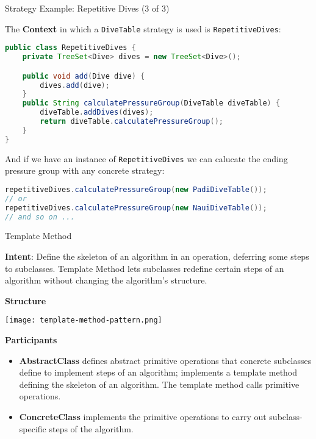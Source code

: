 \documentclass{beamer}
\begin{document}
\begin{frame}[fragile]{Strategy Example: Repetitive Dives (3 of 3)}

\vspace{-.05in}
The {\bf Context} in which a {\tt DiveTable} strategy is used is {\tt RepetitiveDives}:
\vspace{-.05in}
\begin{lstlisting}[language=Java]
public class RepetitiveDives {
    private TreeSet<Dive> dives = new TreeSet<Dive>();

    public void add(Dive dive) {
        dives.add(dive);
    }
    public String calculatePressureGroup(DiveTable diveTable) {
        diveTable.addDives(dives);
        return diveTable.calculatePressureGroup();
    }
}
\end{lstlisting}
And if we have an instance of {\tt RepetitiveDives} we can calucate the ending pressure group with any concrete strategy:
\begin{lstlisting}[language=Java]
repetitiveDives.calculatePressureGroup(new PadiDiveTable());
// or
repetitiveDives.calculatePressureGroup(new NauiDiveTable());
// and so on ...
\end{lstlisting}



\end{frame}



\begin{frame}[fragile]{Template Method}


{\bf Intent}: Define the skeleton of an algorithm in an operation, deferring some steps to subclasses. Template Method lets subclasses redefine certain steps of an algorithm without changing the algorithm's structure.

{\bf Structure}
\vspace{-.175in}
\begin{center}
\texttt{[image: template-method-pattern.png]}\\
\end{center}
\vspace{-.2in}
{\bf Participants}
\begin{itemize}
\item {\bf AbstractClass} defines abstract primitive operations that concrete subclasses define to implement steps of an algorithm; implements a template method defining the skeleton of an algorithm. The template method calls primitive operations.
\item {\bf ConcreteClass} implements the primitive operations to carry out subclass-specific steps of the algorithm.
\end{itemize}


\end{frame}
\end{document}
